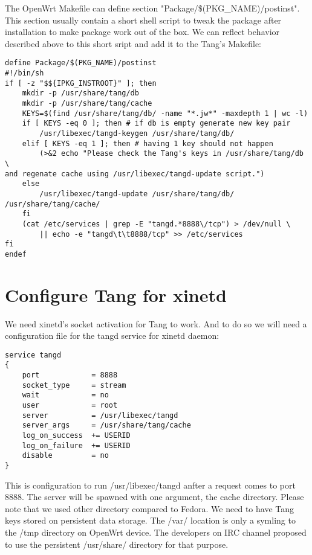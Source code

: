 The OpenWrt Makefile can define section "Package/\$(PKG\_NAME)/postinst".
This section usually contain a short shell script to tweak the package after installation to make package work out of the box.
We can reflect behavior described above to this short sript and add it to the Tang's Makefile:
\begin{lstlisting}[columns=fixed,basicstyle=\ttfamily\footnotesize,tabsize=4,backgroundcolor=\color{yellow!10}]
define Package/$(PKG_NAME)/postinst
#!/bin/sh
if [ -z "$${IPKG_INSTROOT}" ]; then
	mkdir -p /usr/share/tang/db
	mkdir -p /usr/share/tang/cache
	KEYS=$(find /usr/share/tang/db/ -name "*.jw*" -maxdepth 1 | wc -l)
	if [ KEYS -eq 0 ]; then # if db is empty generate new key pair
		/usr/libexec/tangd-keygen /usr/share/tang/db/
	elif [ KEYS -eq 1 ]; then # having 1 key should not happen
		(>&2 echo "Please check the Tang's keys in /usr/share/tang/db \
and regenate cache using /usr/libexec/tangd-update script.")
	else
		/usr/libexec/tangd-update /usr/share/tang/db/ /usr/share/tang/cache/
	fi
	(cat /etc/services | grep -E "tangd.*8888\/tcp") > /dev/null \
		|| echo -e "tangd\t\t8888/tcp" >> /etc/services
fi
endef
\end{lstlisting}



\section{Configure Tang for xinetd}

We need xinetd's socket activation for Tang to work.
And to do so we will need a configuration file for the tangd service for xinetd daemon:
\begin{lstlisting}[columns=fixed,basicstyle=\ttfamily\footnotesize,tabsize=4,backgroundcolor=\color{yellow!10},caption=Configuration of Tang service for xinetd]
service tangd
{
    port            = 8888
    socket_type     = stream
    wait            = no
    user            = root
    server          = /usr/libexec/tangd
    server_args     = /usr/share/tang/cache
    log_on_success  += USERID
    log_on_failure  += USERID
    disable         = no
}
\end{lstlisting}
This is configuration to run /usr/libexec/tangd anfter a request comes to port 8888.
The server will be spawned with one argument, the cache directory.
Please note that we used other directory compared to Fedora.
We need to have Tang keys stored on persistent data storage.
The /var/ location is only a symling to the /tmp directory on OpenWrt device.
The developers on IRC channel proposed to use the persistent /usr/share/ directory for that purpose.

